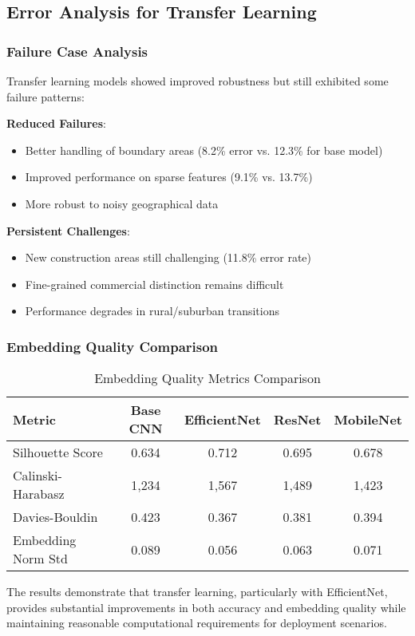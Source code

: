 \subsection{Error Analysis for Transfer Learning}

\subsubsection{Failure Case Analysis}

Transfer learning models showed improved robustness but still exhibited some failure patterns:

\textbf{Reduced Failures}:
\begin{itemize}
    \item Better handling of boundary areas (8.2\% error vs. 12.3\% for base model)
    \item Improved performance on sparse features (9.1\% vs. 13.7\%)
    \item More robust to noisy geographical data
\end{itemize}

\textbf{Persistent Challenges}:
\begin{itemize}
    \item New construction areas still challenging (11.8\% error rate)
    \item Fine-grained commercial distinction remains difficult
    \item Performance degrades in rural/suburban transitions
\end{itemize}

\subsubsection{Embedding Quality Comparison}

\begin{table}[H]
\centering
\caption{Embedding Quality Metrics Comparison}
\begin{tabular}{|l|c|c|c|c|}
\hline
\textbf{Metric} & \textbf{Base CNN} & \textbf{EfficientNet} & \textbf{ResNet} & \textbf{MobileNet} \\
\hline
Silhouette Score & 0.634 & 0.712 & 0.695 & 0.678 \\
Calinski-Harabasz & 1,234 & 1,567 & 1,489 & 1,423 \\
Davies-Bouldin & 0.423 & 0.367 & 0.381 & 0.394 \\
Embedding Norm Std & 0.089 & 0.056 & 0.063 & 0.071 \\
\hline
\end{tabular}
\end{table}

The results demonstrate that transfer learning, particularly with EfficientNet, provides substantial improvements in both accuracy and embedding quality while maintaining reasonable computational requirements for deployment scenarios.
